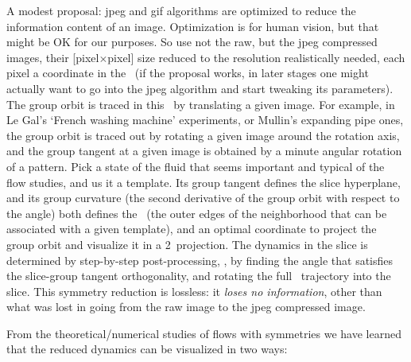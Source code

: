 A modest proposal: jpeg and gif algorithms are optimized to reduce the
information content of an image. Optimization is for human vision, but
that might be OK for our purposes. So use not the raw, but the jpeg
compressed images, their [pixel$\times$pixel] size reduced to the
resolution realistically needed, each pixel a coordinate in the \statesp\
(if the proposal works, in later stages one might actually want to go
into the jpeg algorithm and start tweaking its parameters). The group
orbit is traced in this \statesp\ by translating a given image. For
example, in Le Gal's `French washing machine' experiments, or Mullin's
expanding pipe ones, the group orbit is traced out by rotating a given
image around the rotation axis, and the group tangent at a given image is
obtained by a minute angular rotation of a pattern. Pick a state of the
fluid that seems important and typical of the flow studies, and us it a
template. Its group tangent defines the slice hyperplane, and its group
curvature (the second derivative of the group orbit with respect to the
angle) both defines the \sset\ (the outer edges of the neighborhood that
can be associated with a given template), and an optimal coordinate to
project the group orbit and visualize it in a 2\dmn\ projection. The
dynamics in the slice is determined by step-by-step post-processing, \ie,
by finding the angle that satisfies the slice-group tangent
orthogonality, and rotating the full \statesp\ trajectory into the slice.
This symmetry reduction is lossless: it \emph{loses no information},
other than what was lost in going from the raw image to the jpeg
compressed image.

From the theoretical/numerical studies of flows with symmetries%
\rf{SCD07,ACHKW11}
we have learned that the reduced dynamics can be visualized in two ways:

